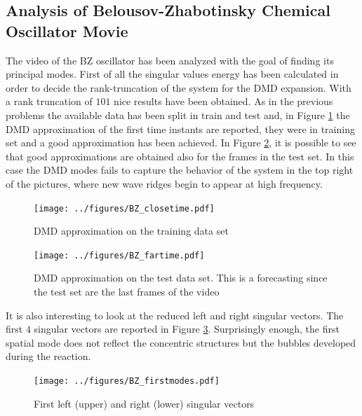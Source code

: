 \documentclass[]{article}
\begin{document}
\subsection{Analysis of  Belousov-Zhabotinsky Chemical Oscillator Movie}
The video of the BZ oscillator has been analyzed with the goal of finding its principal modes. First of all the singular values energy has been calculated in order to decide the rank-truncation of the system for the DMD expansion. With a rank truncation of $101$ nice results have been obtained. As in the previous problems the available data has been split in train and test and, in Figure \ref{fig:fig14} the DMD approximation of the first time instants are reported, they were in training set and a good approximation has been achieved. In Figure \ref{fig:fig15}, it is possible to see that good approximations are obtained also for the frames in the test set. In this case the DMD modes fails to capture the behavior of the system in the top right of the pictures, where new wave ridges begin to appear at high frequency.
\begin{figure}[h]
	\centering
	\texttt{[image: ../figures/BZ\_closetime.pdf]}
	\caption{DMD approximation on the training data set}
	\label{fig:fig14}
\end{figure}
\begin{figure}[h]
	\centering
	\texttt{[image: ../figures/BZ\_fartime.pdf]}
	\caption{DMD approximation on the test data set. This is a forecasting since the test set are the last frames of the video}
	\label{fig:fig15}
\end{figure}
It is also interesting to look at the reduced left and right singular vectors. The first $4$ singular vectors are reported in Figure \ref{fig:fig16}. Surprisingly enough, the first spatial mode does not reflect the concentric structures but the bubbles developed during the reaction.
\begin{figure}[h]
	\centering
	\texttt{[image: ../figures/BZ\_firstmodes.pdf]}
	\caption{First left (upper) and right (lower) singular vectors}
	\label{fig:fig16}
\end{figure}
\newpage
\end{document}
